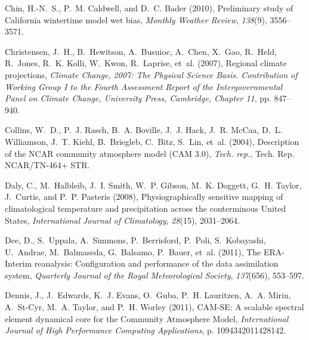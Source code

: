 \documentclass[ms,draft]{agutex}   %
\begin{document}
\begin{article}
\begin{thebibliography}{84}
Chin, H.-N.~S., P.~M. Caldwell, and D.~C. Bader (2010), {Preliminary study of
  California wintertime model wet bias}, \textit{Monthly Weather Review},
  \textit{138}(9), 3556--3571.

Christensen, J.~H., B.~Hewitson, A.~Busuioc, A.~Chen, X.~Gao, R.~Held,
  R.~Jones, R.~K. Kolli, W.~Kwon, R.~Laprise, et~al. (2007), Regional climate
  projections, \textit{Climate Change, 2007: The Physical Science Basis.
  Contribution of Working Group I to the Fourth Assessment Report of the
  Intergovernmental Panel on Climate Change, University Press, Cambridge,
  Chapter 11}, pp. 847--940.

Collins, W.~D., P.~J. Rasch, B.~A. Boville, J.~J. Hack, J.~R. McCaa, D.~L.
  Williamson, J.~T. Kiehl, B.~Briegleb, C.~Bitz, S.~Lin, et~al. (2004),
  {Description of the NCAR community atmosphere model (CAM 3.0)}, \textit{Tech.
  rep.}, Tech. Rep. NCAR/TN-464+ STR.

Daly, C., M.~Halbleib, J.~I. Smith, W.~P. Gibson, M.~K. Doggett, G.~H. Taylor,
  J.~Curtis, and P.~P. Pasteris (2008), {Physiographically sensitive mapping of
  climatological temperature and precipitation across the conterminous United
  States}, \textit{International Journal of Climatology}, \textit{28}(15),
  2031--2064.

Dee, D., S.~Uppala, A.~Simmons, P.~Berrisford, P.~Poli, S.~Kobayashi,
  U.~Andrae, M.~Balmaseda, G.~Balsamo, P.~Bauer, et~al. (2011), {The
  ERA-Interim reanalysis: Configuration and performance of the data
  assimilation system}, \textit{Quarterly Journal of the Royal Meteorological
  Society}, \textit{137}(656), 553--597.

Dennis, J., J.~Edwards, K.~J. Evans, O.~Guba, P.~H. Lauritzen, A.~A. Mirin,
  A.~St-Cyr, M.~A. Taylor, and P.~H. Worley (2011), {CAM-SE: A scalable
  spectral element dynamical core for the Community Atmosphere Model},
  \textit{International Journal of High Performance Computing Applications}, p.
  1094342011428142.


\end{thebibliography}
\end{article}
\end{document}
